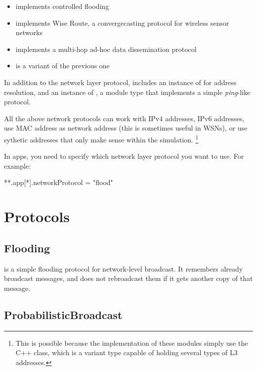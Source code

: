 \begin{itemize}
  \item {} implements controlled flooding
  \item {} implements Wise Route, a convergecasting protocol for wireless sensor networks
  \item {} implements a multi-hop ad-hoc data dissemination protocol
  \item {} is a variant of the previous one
\end{itemize}

In addition to the network layer protocol, 
includes an instance of  for address resolution,
and an instance of , a module type that
implements a simple \textit{ping}-like protocol.

All the above network protocols can work with IPv4 addresses, IPv6 addresses,
use MAC address as network address (this is sometimes useful in WSNs),
or use sythetic addresses that only make sense within the simulation.
\footnote{This is possible because the implementation of these modules 
simply use the  C++ class, which is a variant type capable of
holding several types of L3 addresses.}

In apps, you need to specify which network layer protocol you want to use.
For example:

\begin{inifile}
**.app[*].networkProtocol = "flood"
\end{inifile}


\section{Protocols}

\subsection{Flooding}

 is a simple flooding protocol for network-level broadcast.
It remembers already broadcast messages, and does not rebroadcast 
them if it gets another copy of that message.

\subsection{ProbabilisticBroadcast}

